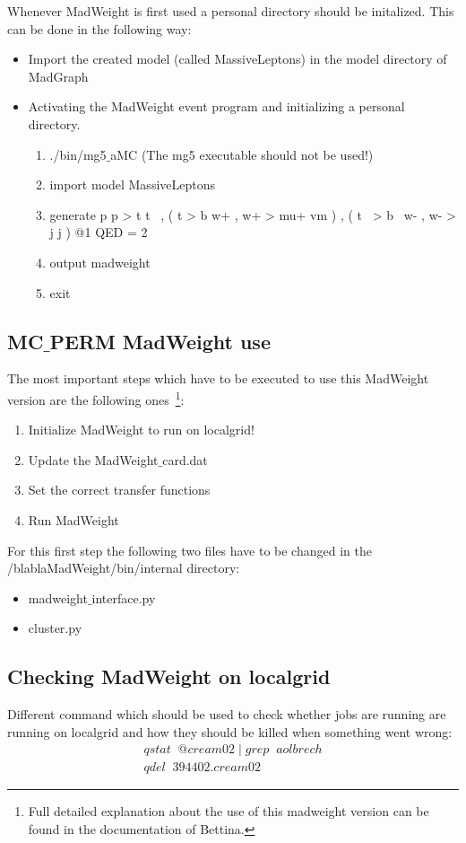 Whenever MadWeight is first used a personal directory should be initalized. This can be done in the following way:
\begin{itemize}
  \item Import the created model (called MassiveLeptons) in the model directory of MadGraph
  \item Activating the MadWeight event program and initializing a personal directory.
  \begin{enumerate}
    \item ./bin/mg5$\_$aMC (The mg5 executable should not be used!)
    \item import model MassiveLeptons
    \item generate p p > t t~ , ( t > b w+ , w+ > mu+ vm ) , ( t~ > b~ w- , w- > j j ) @1 QED = 2 
    \item output madweight
    \item exit
  \end{enumerate}
\end{itemize}

\subsection{MC$\_$PERM MadWeight use}
The most important steps which have to be executed to use this MadWeight version are the following ones~\footnote{Full detailed explanation about the use of this madweight version can be found in the documentation of Bettina.}:
\begin{enumerate}
  \item Initialize MadWeight to run on localgrid!
  \item Update the MadWeight$\_$card.dat
  \item Set the correct transfer functions
  \item Run MadWeight
\end{enumerate}

For this first step the following two files have to be changed in the /blablaMadWeight/bin/internal directory:
\begin{itemize}
  \item madweight$\_$interface.py
  \item cluster.py
\end{itemize}

\subsection{Checking MadWeight on localgrid}
Different command which should be used to check whether jobs are running are running on localgrid and how they should be killed when something went wrong:
\begin{eqnarray}
 qstat \; \; @cream02 \; | \; grep \; \; aolbrech \\
 qdel \; \; 394402.cream02
\end{eqnarray}

